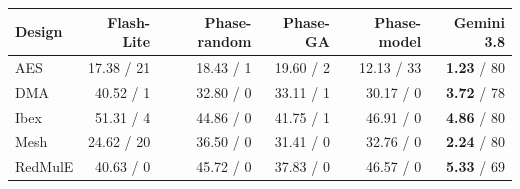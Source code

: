 \begin{tabular}{lrrrrr}
\toprule
Design & Flash-Lite & Phase-random & Phase-GA & Phase-model & Gemini 3.8 \\
\midrule
AES & 17.38 / 21 & 18.43 / 1 & 19.60 / 2 & 12.13 / 33 & \textbf{1.23} / 80 \\
DMA & 40.52 / 1 & 32.80 / 0 & 33.11 / 1 & 30.17 / 0 & \textbf{3.72} / 78 \\
Ibex & 51.31 / 4 & 44.86 / 0 & 41.75 / 1 & 46.91 / 0 & \textbf{4.86} / 80 \\
Mesh & 24.62 / 20 & 36.50 / 0 & 31.41 / 0 & 32.76 / 0 & \textbf{2.24} / 80 \\
RedMulE & 40.63 / 0 & 45.72 / 0 & 37.83 / 0 & 46.57 / 0 & \textbf{5.33} / 69 \\
\bottomrule
\end{tabular}
